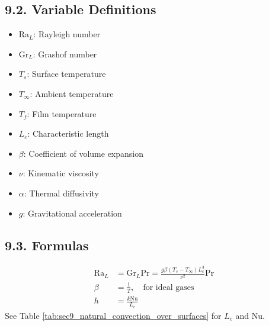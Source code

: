 \begin{multicols*}{2}
\subsection*{9.2. Variable Definitions}
\begin{itemize}
    \item Ra$_L$: Rayleigh number
    \item Gr$_L$: Grashof number
    \item $T_s$: Surface temperature
    \item $T_\infty$: Ambient temperature
    \item $T_f$: Film temperature
    \item $L_c$: Characteristic length
    \item $\beta$: Coefficient of volume expansion
    \item $\nu$: Kinematic viscosity
    \item $\alpha$: Thermal diffusivity
    \item $g$: Gravitational acceleration
\end{itemize}

\subsection*{9.3. Formulas}
\begin{align*}
    \text{Ra}_L &= \text{Gr}_L \text{Pr} = \frac{g \beta (T_s - T_\infty) L_c^3}{\nu^2} \text{Pr} \\
    \beta &= \frac{1}{T}, \quad \text{for ideal gases} \\
    h &= \frac{k \text{Nu}}{L_c} 
\end{align*}
See Table \ref{tab:sec9_natural_convection_over_surfaces} for $L_c$ and Nu.

\end{multicols*}
